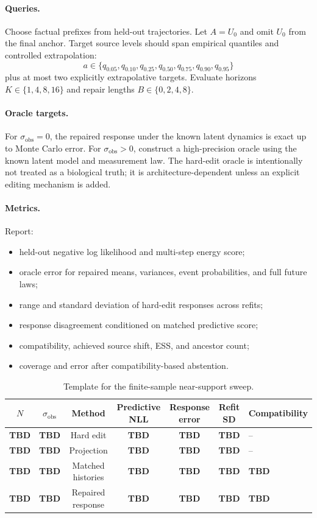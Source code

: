 \documentclass{article}
\newcommand{\TBD}{\textcolor{placeholderred}{\textbf{TBD}}}
\theoremstyle{remark}
\begin{document}
\paragraph{Queries.}
Choose factual prefixes from held-out trajectories. Let \(A=U_0\) and omit
\(U_0\) from the final anchor. Target source levels should span empirical
quantiles and controlled extrapolation:
\[
  a\in
  \{
    q_{0.05},q_{0.10},q_{0.25},q_{0.50},
    q_{0.75},q_{0.90},q_{0.95}
  \}
\]
plus at most two explicitly extrapolative targets. Evaluate horizons
\(K\in\{1,4,8,16\}\) and repair lengths
\(B\in\{0,2,4,8\}\).

\paragraph{Oracle targets.}
For \(\sigma_{\mathrm{obs}}=0\), the repaired response under the known latent
dynamics is exact up to Monte Carlo error. For \(\sigma_{\mathrm{obs}}>0\),
construct a high-precision oracle using the known latent model and
measurement law. The hard-edit oracle is intentionally not treated as a
biological truth; it is architecture-dependent unless an explicit editing
mechanism is added.

\paragraph{Metrics.}
Report:
\begin{itemize}[leftmargin=1.5em]
  \item held-out negative log likelihood and multi-step energy score;
  \item oracle error for repaired means, variances, event probabilities, and
  full future laws;
  \item range and standard deviation of hard-edit responses across refits;
  \item response disagreement conditioned on matched predictive score;
  \item compatibility, achieved source shift, ESS, and ancestor count;
  \item coverage and error after compatibility-based abstention.
\end{itemize}

\begin{table}[h]
\centering
\small
\caption{Template for the finite-sample near-support sweep.}
\label{tab:near-support-template}
\begin{tabularx}{\linewidth}{cccccc>{\centering\arraybackslash}X}
\toprule
\(N\) & \(\sigma_{\mathrm{obs}}\) & Method &
Predictive NLL & Response error & Refit SD & Compatibility \\
\midrule
\TBD & \TBD & Hard edit & \TBD & \TBD & \TBD & -- \\
\TBD & \TBD & Projection & \TBD & \TBD & \TBD & -- \\
\TBD & \TBD & Matched histories & \TBD & \TBD & \TBD & \TBD \\
\TBD & \TBD & Repaired response & \TBD & \TBD & \TBD & \TBD \\
\bottomrule
\end{tabularx}
\end{table}
\end{document}
